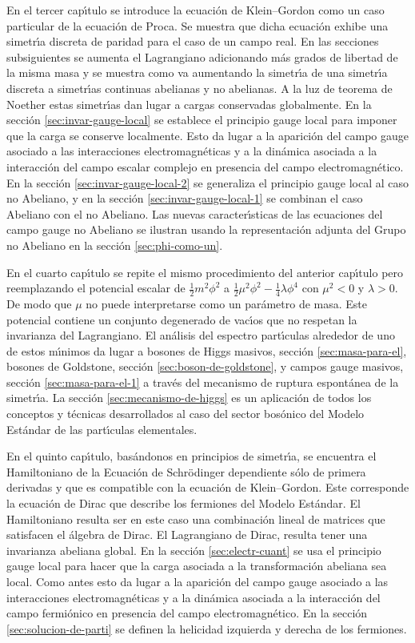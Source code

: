 En el tercer cap\'\i tulo se introduce la ecuaci\'on de Klein--Gordon como un caso particular de la ecuaci\'on de Proca. Se muestra que dicha ecuaci\'on exhibe una simetr\'\i a discreta de paridad para el caso de un campo real. En las secciones subsiguientes se aumenta el Lagrangiano adicionando m\'as grados de libertad de la misma masa y se muestra como va aumentando la simetr\'\i a de una simetr\'\i a discreta a simetr\'\i as continuas abelianas y no abelianas. A la luz de teorema de Noether estas simetr\'\i as dan lugar a cargas conservadas globalmente. En la secci\'on \ref{sec:invar-gauge-local} se establece el principio gauge local para imponer que la carga se conserve localmente. Esto da lugar a la aparici\'on del campo gauge asociado a las interacciones electromagn\'eticas y a la din\'amica asociada a la interacci\'on del campo escalar complejo en presencia del campo electromagn\'etico. En la secci\'on \ref{sec:invar-gauge-local-2} se generaliza el principio gauge local al caso no Abeliano, y en la secci\'on \ref{sec:invar-gauge-local-1} se combinan el caso Abeliano con el no Abeliano. Las nuevas caracter\'\i sticas de las ecuaciones del campo gauge no Abeliano se ilustran usando la representaci\'on adjunta del Grupo no Abeliano en la secci\'on \ref{sec:phi-como-un}.

En el cuarto cap\'\i tulo se repite el mismo procedimiento del anterior cap\'\i tulo pero reemplazando el potencial escalar de $\frac{1}{2}m^2\phi^2$ a $\frac{1}{2}\mu^2\phi^2-\frac{1}{4}\lambda\phi^4$ con $\mu^2\lt 0$ y $\lambda\gt 0$. De modo que $\mu$ no puede interpretarse como un par\'ametro de masa. Este potencial contiene un conjunto degenerado de vac\'\i os que no respetan la invarianza del Lagrangiano. El an\'alisis del espectro part\'\i culas alrededor de uno de estos m\'\i nimos da lugar a bosones de Higgs masivos, secci\'on \ref{sec:masa-para-el}, bosones de Goldstone, secci\'on \ref{sec:boson-de-goldstone}, y campos gauge masivos, secci\'on \ref{sec:masa-para-el-1} a trav\'es del mecanismo de ruptura espont\'anea de la simetr\'\i a. La secci\'on \ref{sec:mecanismo-de-higgs} es un aplicaci\'on de todos los conceptos y t\'ecnicas desarrollados al caso del sector bos\'onico del Modelo Est\'andar de las part\'\i culas elementales. 

En el quinto cap\'\i tulo, bas\'andonos en principios de simetr\'\i a, se encuentra el Hamiltoniano de la Ecuaci\'on de Schr\"odinger dependiente s\'olo de primera derivadas y que es compatible con la ecuaci\'on de Klein--Gordon. Este corresponde la ecuaci\'on de Dirac que describe los fermiones del Modelo Est\'andar. El Hamiltoniano resulta ser en este caso una combinaci\'on lineal de matrices que satisfacen el \'algebra de Dirac. El Lagrangiano de Dirac, resulta tener una invarianza abeliana global. En la secci\'on \ref{sec:electr-cuant} se usa el principio gauge local para hacer que la carga asociada a la transformaci\'on abeliana sea local. Como antes  esto da lugar a la aparici\'on del campo gauge asociado a las interacciones electromagn\'eticas y a la din\'amica asociada a la interacci\'on del campo fermi\'onico  en presencia del campo electromagn\'etico. En la secci\'on \ref{sec:solucion-de-parti} se definen la helicidad izquierda y derecha de los fermiones.

